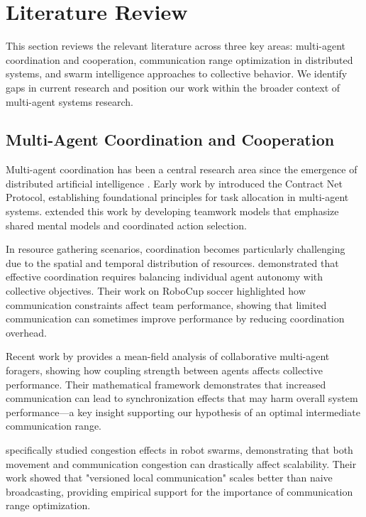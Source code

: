 \documentclass[12pt,a4paper]{article}
\begin{document}
\section{Literature Review}
\label{sec:literature}

This section reviews the relevant literature across three key areas: multi-agent coordination and cooperation, communication range optimization in distributed systems, and swarm intelligence approaches to collective behavior. We identify gaps in current research and position our work within the broader context of multi-agent systems research.

\subsection{Multi-Agent Coordination and Cooperation}

Multi-agent coordination has been a central research area since the emergence of distributed artificial intelligence \parencite{bond1988readings}. Early work by \textcite{smith1980contract} introduced the Contract Net Protocol, establishing foundational principles for task allocation in multi-agent systems. \textcite{tambe1997towards} extended this work by developing teamwork models that emphasize shared mental models and coordinated action selection.

In resource gathering scenarios, coordination becomes particularly challenging due to the spatial and temporal distribution of resources. \textcite{stone2000multiagent} demonstrated that effective coordination requires balancing individual agent autonomy with collective objectives. Their work on RoboCup soccer highlighted how communication constraints affect team performance, showing that limited communication can sometimes improve performance by reducing coordination overhead.

Recent work by \textcite{jarne2022mean} provides a mean-field analysis of collaborative multi-agent foragers, showing how coupling strength between agents affects collective performance. Their mathematical framework demonstrates that increased communication can lead to synchronization effects that may harm overall system performance—a key insight supporting our hypothesis of an optimal intermediate communication range.

\textcite{soma2023congestion} specifically studied congestion effects in robot swarms, demonstrating that both movement and communication congestion can drastically affect scalability. Their work showed that "versioned local communication" scales better than naive broadcasting, providing empirical support for the importance of communication range optimization.
\end{document}
